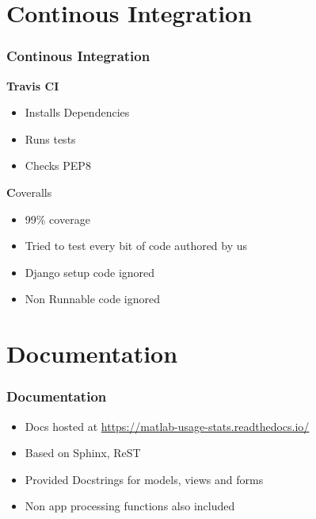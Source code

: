 \documentclass{beamer}
\begin{document}
\section{Continous Integration}
\begin{frame}
    \frametitle{Continous Integration}
    \textbf{Travis CI}
    \begin{itemize}
        \item Installs Dependencies
        \item Runs tests
        \item Checks PEP8
    \end{itemize}
    \textbf Coveralls
    \begin{itemize}
        \item 99\% coverage
        \item Tried to test every bit of code authored by us
        \item Django setup code ignored
        \item Non Runnable code ignored
    \end{itemize}
\end{frame}

\section{Documentation}
\begin{frame}
    \frametitle{Documentation}
    \begin{itemize}
        \item Docs hosted at \url{https://matlab-usage-stats.readthedocs.io/}
        \item Based on Sphinx, ReST
        \item Provided Docstrings for models, views and forms
        \item Non app processing functions also included
    \end{itemize}
\end{frame}
\end{document}
